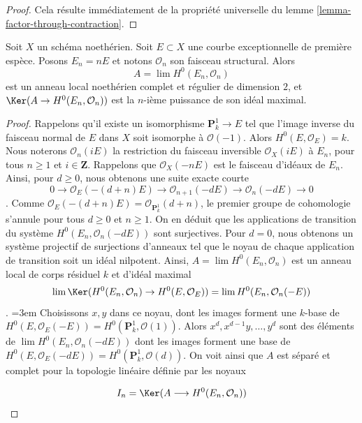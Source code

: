 \begin{proof} Cela résulte immédiatement de la propriété universelle du lemme \ref{lemma-factor-through-contraction}. \end{proof}

\begin{lemma} \label{lemma-exceptional-first-kind-local} Soit $X$ un schéma noethérien. Soit $E \subset X$ une courbe exceptionnelle de première espèce. Posons $E_n = nE$ et notons $\mathcal{O}_n$ son faisceau structural. Alors $$
A = \lim H^0(E_n, \mathcal{O}_n)
$$ est un anneau local noethérien complet et régulier de dimension $2$, et $\Ker(A \to H^0(E_n, \mathcal{O}_n))$ est la $n$-ième puissance de son idéal maximal. \end{lemma}

\begin{proof} Rappelons qu'il existe un isomorphisme $\mathbf{P}^1_k \to E$ tel que l'image inverse du faisceau normal de $E$ dans $X$ soit isomorphe à $\mathcal{O}(-1)$. Alors $H^0(E, \mathcal{O}_E) = k$. Nous noterons $\mathcal{O}_n(iE)$ la restriction du faisceau inversible $\mathcal{O}_X(iE)$ à $E_n$, pour tous $n \geq 1$ et $i \in \mathbf{Z}$. Rappelons que $\mathcal{O}_X(-nE)$ est le faisceau d'idéaux de $E_n$. Ainsi, pour $d \geq 0$, nous obtenons une suite exacte courte $$
0 \to \mathcal{O}_E(-(d + n)E) \to
\mathcal{O}_{n + 1}(-dE) \to
\mathcal{O}_n(-dE) \to 0
$$. Comme $\mathcal{O}_E(-(d + n)E) = \mathcal{O}_{\mathbf{P}^1_k}(d + n)$, le premier groupe de cohomologie s'annule pour tous $d \geq 0$ et $n \geq 1$. On en déduit que les applications de transition du système $H^0(E_n, \mathcal{O}_n(-dE))$ sont surjectives. Pour $d = 0$, nous obtenons un système projectif de surjections d'anneaux tel que le noyau de chaque application de transition soit un idéal nilpotent. Ainsi, $A = \lim H^0(E_n, \mathcal{O}_n)$ est un anneau local de corps résiduel $k$ et d'idéal maximal $$
\lim \Ker(H^0(E_n, \mathcal{O}_n) \to H^0(E, \mathcal{O}_E)) =
\lim H^0(E_n, \mathcal{O}_n(-E))
$$.
\begingroup\emergencystretch=3em
Choisissons $x, y$ dans ce noyau, dont les images forment une $k$-base de $H^0(E, \mathcal{O}_E(-E)) = H^0(\mathbf{P}^1_k, \mathcal{O}(1))$. Alors $x^d, x^{d - 1}y, \ldots, y^d$ sont des éléments de $\lim H^0(E_n, \mathcal{O}_n(-dE))$ dont les images forment une base de $H^0(E, \mathcal{O}_E(-dE)) = H^0(\mathbf{P}^1_k, \mathcal{O}(d))$. On voit ainsi que $A$ est séparé et complet pour la topologie linéaire définie par les noyaux\par\endgroup
$$
I_n = \Ker(A \longrightarrow H^0(E_n, \mathcal{O}_n))
$$
\end{proof}
